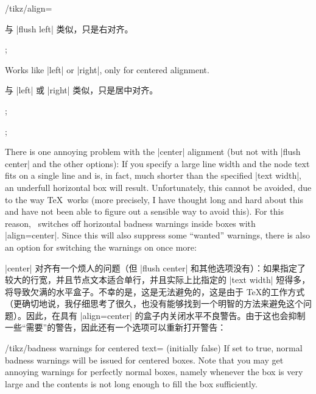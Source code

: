\begin{key}{/tikz/align=}
\begin{description}
            与 |flush left| 类似，只是右对齐。
\begin{codeexample}[]
\tikz {};
\end{codeexample}
        \item[|align=|\declare{|center|}] Works like |left| or |right|, only
            for centered alignment.
            
            与 |left| 或 |right| 类似，只是居中对齐。
\begin{codeexample}[]
\tikz {};
\end{codeexample}
\begin{codeexample}[]
\tikz {};
\end{codeexample}

            There is one annoying problem with the |center| alignment (but not
            with |flush center| and the other options): If you specify a large
            line width and the node text fits on a single line and is, in fact,
            much shorter than the specified |text width|, an underfull
            horizontal box will result. Unfortunately, this cannot be avoided,
            due to the way \TeX\ works (more precisely, I have thought long and
            hard about this and have not been able to figure out a sensible way
            to avoid this). For this reason, \tikzname\ switches off horizontal
            badness warnings inside boxes with |align=center|. Since this will
            also suppress some ``wanted'' warnings, there is also an option for
            switching the warnings on once more:
            
            |center| 对齐有一个烦人的问题（但 |flush center| 和其他选项没有）：如果指定了较大的行宽，并且节点文本适合单行，并且实际上比指定的 |text width| 短得多，将导致欠满的水平盒子。不幸的是，这是无法避免的，这是由于 \TeX 的工作方式（更确切地说，我仔细思考了很久，也没有能够找到一个明智的方法来避免这个问题）。因此，\tikzname 在具有 |align=center| 的盒子内关闭水平不良警告。由于这也会抑制一些“需要”的警告，因此还有一个选项可以重新打开警告：

            \begin{key}{/tikz/badness warnings for centered text= (initially false)}
                If set to true, normal badness warnings will be issued for
                centered boxes. Note that you may get annoying warnings for
                perfectly normal boxes, namely whenever the box is very large
                and the contents is not long enough to fill the box
                sufficiently.


\end{key}
\end{description}
\end{key}
